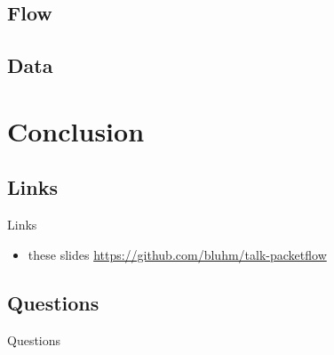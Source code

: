 \documentclass[14pt]{beamer}
\begin{document}
\subsection{Flow}

\subsection{Data}

\section{Conclusion}

\subsection{Links}
\begin{frame}{Links}
\begin{itemize}
    \item these slides
	{\small \url{https://github.com/bluhm/talk-packetflow}}
\end{itemize}
\end{frame}

\subsection{Questions}
\begin{frame}{Questions}
\begin{center}
\end{center}
\end{frame}
\end{document}
